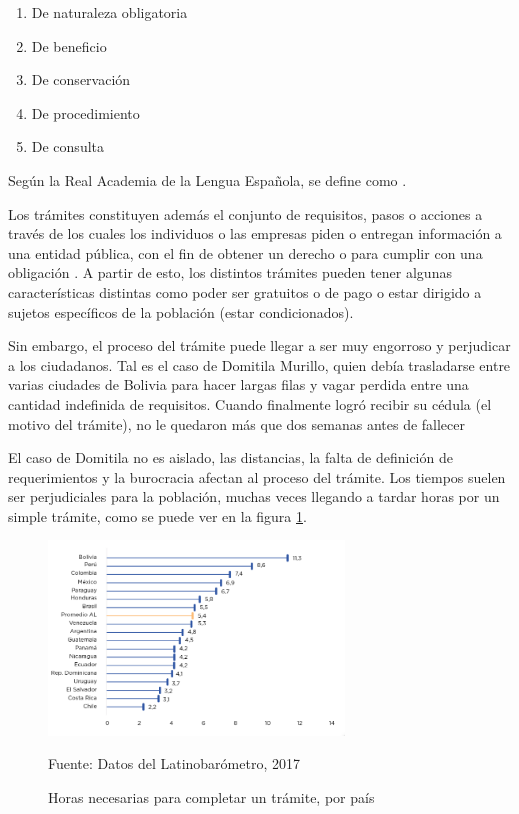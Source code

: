 \begin{enumerate}
    \item De naturaleza obligatoria
    \item De beneficio
    \item De conservación
    \item De procedimiento
    \item De consulta
\end{enumerate}

Según la Real Academia de la Lengua Española, se define como 
\parencite{asaleDiccionarioLenguaEspanola}.

Los trámites constituyen además el conjunto de requisitos, pasos o acciones a
través de los cuales los individuos o las empresas piden o entregan información
a una entidad pública, con el fin de obtener un derecho o para cumplir con una
obligación \cite{rosethFinTramiteEterno2018}. A partir de esto, los distintos
trámites pueden tener algunas características distintas como poder ser gratuitos
o de pago o estar dirigido a sujetos específicos de la población (estar
condicionados).

Sin embargo, el proceso del trámite puede llegar a ser muy engorroso y
perjudicar a los ciudadanos. Tal es el caso de Domitila Murillo, quien debía
trasladarse entre varias ciudades de Bolivia para hacer largas filas y vagar
perdida entre una cantidad indefinida de requisitos. Cuando finalmente logró
recibir su cédula (el motivo del trámite), no le quedaron más que dos semanas
antes de fallecer \cite{charoskyquejatramite}

El caso de Domitila no es aislado, las distancias, la falta de definición de
requerimientos y la burocracia afectan al proceso del trámite. Los tiempos
suelen ser perjudiciales para la población, muchas veces llegando a tardar horas
por un simple trámite, como se puede ver en la figura \ref{fig:horastramite}.

\begin{figure}[htbp]
    \centering
    \includegraphics[width=0.7\textwidth]{assets/horastramite}
    \caption{Horas necesarias para completar un trámite, por país}{Fuente: Datos del Latinobarómetro, 2017}
    \label{fig:horastramite}
\end{figure}

